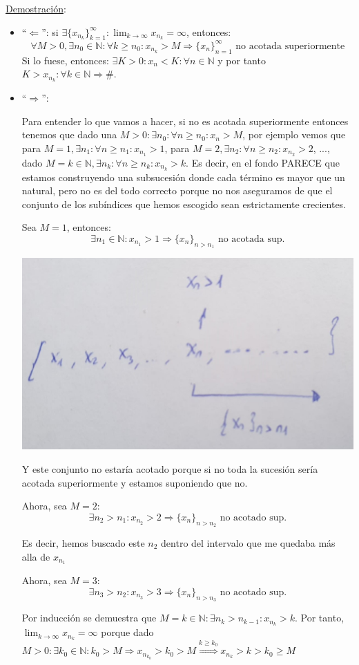 \documentclass[10pt,a4paper,openright]{book}
\begin{document}
\underline{Demostración}:
\begin{itemize}
\item ``$\Leftarrow$'': si $\exists \{x_{n_k}\}_{k=1}^\infty : \lim_{k\rightarrow \infty}x_{n_k}=\infty$, entonces:
$$\forall M>0, \exists n_0\in \mathbb N: \forall k\geq n_0: x_{n_k}>M\Rightarrow \{x_n\}_{n=1}^\infty\mbox{ no acotada superiormente}$$
Si lo fuese, entonces: $\exists K>0: x_n<K: \forall n\in \mathbb N$ y por tanto $K>x_{n_k}: \forall k\in \mathbb N\Rightarrow \#$.

\item ``$\Rightarrow$'':\par
Para entender lo que vamos a hacer, si no es acotada superiormente entonces tenemos que dado una $M>0:\exists n_0:\forall n\geq n_0: x_n>M$, por ejemplo vemos que para $M=1, \exists n_1:\forall n\geq n_1: x_{n_1}>1$, para $M=2, \exists n_2:\forall n\geq n_2: x_{n_2}>2$, ..., dado $M=k\in \mathbb N, \exists n_k:\forall n\geq n_k: x_{n_k}>k$. Es decir, en el fondo PARECE que estamos construyendo una subsucesión donde cada término es mayor que un natural, pero no es del todo correcto porque no nos aseguramos de que el conjunto de los subíndices que hemos escogido sean estrictamente crecientes.

\par Sea $M=1$, entonces:
$$\exists n_1\in \mathbb N: x_{n_1}>1\Rightarrow \{x_n\}_{n>n_1} \mbox{ no acotada sup.}$$

\begin{center}
\includegraphics[scale=0.15]{proposicion subsucesiones}
\end{center}

Y este conjunto no estaría acotado porque si no toda la sucesión sería acotada superiormente y estamos suponiendo que no.

Ahora, sea $M=2$:
$$\exists n_2>n_1: x_{n_2}>2\Rightarrow \{x_n\}_{n>n_2}\mbox{ no acotado sup.}$$

Es decir, hemos buscado este $n_2$ dentro del intervalo que me quedaba más alla de $x_{n_1}$

Ahora, sea $M=3$:
$$\exists n_3>n_2: x_{n_3}>3\Rightarrow \{x_n\}_{n>n_3}\mbox{ no acotado sup.}$$


Por inducción se demuestra que $M=k\in \mathbb N: \exists n_k>n_{k-1}: x_{n_k}>k$. Por tanto, $\lim_{k\rightarrow \infty} x_{n_k}=\infty$ porque dado $M>0: \exists k_0\in \mathbb N: k_0>M\Rightarrow x_{n_{k_0}}>k_0>M\stackrel{k\geq k_0}{\Rightarrow} x_{n_k}>k>k_0\geq M$
\end{itemize}
\end{document}
